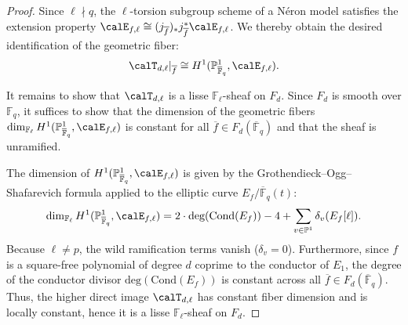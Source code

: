 \begin{proof}
    Since $\ell \nmid q$, the $\ell$-torsion subgroup scheme of a N\'eron model satisfies the extension property $\calE_{f,\ell} \cong (j_{\overline{f}})_* j_{\overline{f}}^* \calE_{f,\ell}$. We thereby obtain the desired identification of the geometric fiber:
    \[ \calT_{d,\ell}|_{\overline{f}} \cong H^1(\mathbb{P}^1_{\overline{\mathbb{F}}_q}, \calE_{f,\ell}). \]
    
    It remains to show that $\calT_{d,\ell}$ is a lisse $\mathbb{F}_\ell$-sheaf on $F_d$. Since $F_d$ is smooth over $\mathbb{F}_q$, it suffices to show that the dimension of the geometric fibers $\dim_{\mathbb{F}_\ell} H^1(\mathbb{P}^1_{\overline{\mathbb{F}}_q}, \calE_{f,\ell})$ is constant for all $\overline{f} \in F_d(\overline{\mathbb{F}}_q)$ and that the sheaf is unramified. 
    
    The dimension of $H^1(\mathbb{P}^1_{\overline{\mathbb{F}}_q}, \calE_{f,\ell})$ is given by the Grothendieck--Ogg--Shafarevich formula applied to the elliptic curve $E_f / \overline{\mathbb{F}}_q(t)$:
    \[ \dim_{\mathbb{F}_\ell} H^1(\mathbb{P}^1_{\overline{\mathbb{F}}_q}, \calE_{f,\ell}) = 2 \cdot \text{deg}(\text{Cond}(E_f)) - 4 + \sum_{v \in \mathbb{P}^1} \delta_v(E_f[\ell]). \]
    Because $\ell \neq p$, the wild ramification terms vanish ($\delta_v = 0$). Furthermore, since $f$ is a square-free polynomial of degree $d$ coprime to the conductor of $E_1$, the degree of the conductor divisor $\text{deg}(\text{Cond}(E_f))$ is constant across all $\overline{f} \in F_d(\overline{\mathbb{F}}_q)$. Thus, the higher direct image $\calT_{d,\ell}$ has constant fiber dimension and is locally constant, hence it is a lisse $\mathbb{F}_\ell$-sheaf on $F_d$.
    
    
    

\end{proof}

